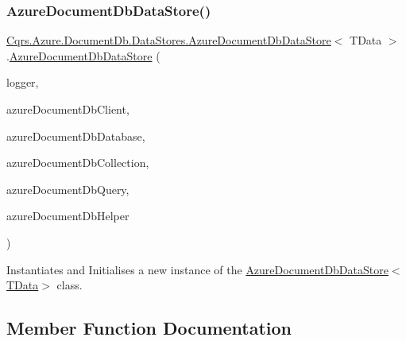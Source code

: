 \subsubsection{\texorpdfstring{Azure\+Document\+Db\+Data\+Store()}{AzureDocumentDbDataStore()}}
{\footnotesize\ttfamily \hyperlink{classCqrs_1_1Azure_1_1DocumentDb_1_1DataStores_1_1AzureDocumentDbDataStore}{Cqrs.\+Azure.\+Document\+Db.\+Data\+Stores.\+Azure\+Document\+Db\+Data\+Store}$<$ T\+Data $>$.\hyperlink{classCqrs_1_1Azure_1_1DocumentDb_1_1DataStores_1_1AzureDocumentDbDataStore}{Azure\+Document\+Db\+Data\+Store} (\begin{DoxyParamCaption}\item[{I\+Logger}]{logger,  }\item[{Document\+Client}]{azure\+Document\+Db\+Client,  }\item[{Database}]{azure\+Document\+Db\+Database,  }\item[{Document\+Collection}]{azure\+Document\+Db\+Collection,  }\item[{I\+Ordered\+Queryable$<$ T\+Data $>$}]{azure\+Document\+Db\+Query,  }\item[{\hyperlink{interfaceCqrs_1_1Azure_1_1DocumentDb_1_1IAzureDocumentDbHelper}{I\+Azure\+Document\+Db\+Helper}}]{azure\+Document\+Db\+Helper }\end{DoxyParamCaption})}



Instantiates and Initialises a new instance of the \hyperlink{classCqrs_1_1Azure_1_1DocumentDb_1_1DataStores_1_1AzureDocumentDbDataStore_add3f66df634a9e9ca0cbd4498e4478f6_add3f66df634a9e9ca0cbd4498e4478f6}{Azure\+Document\+Db\+Data\+Store$<$\+T\+Data$>$} class. 



\subsection{Member Function Documentation}
\mbox{\label{classCqrs_1_1Azure_1_1DocumentDb_1_1DataStores_1_1AzureDocumentDbDataStore_ad17e6e846430e617af24be48b77d1528_ad17e6e846430e617af24be48b77d1528}} 
